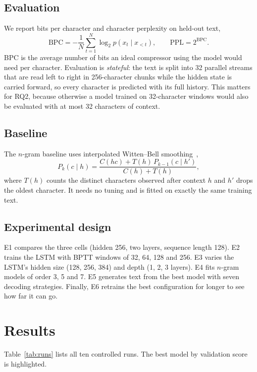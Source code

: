 \documentclass[journal,a4paper]{IEEEtran}
\newcommand{\BPC}{\mathrm{BPC}}
\begin{document}
\subsection{Evaluation}
We report bits per character and character perplexity on held-out text,
\begin{equation}
\BPC = -\frac{1}{N}\sum_{t=1}^{N}\log_2 p(x_t \mid x_{<t}), \qquad \mathrm{PPL} = 2^{\BPC}.
\end{equation}
BPC is the average number of bits an ideal compressor using the model would need per character. Evaluation is \emph{stateful}: the text is split into 32 parallel streams that are read left to right in 256-character chunks while the hidden state is carried forward, so every character is predicted with its full history. This matters for RQ2, because otherwise a model trained on 32-character windows would also be evaluated with at most 32 characters of context.

\subsection{Baseline}
The $n$-gram baseline uses interpolated Witten--Bell smoothing~\cite{witten1991},
\begin{equation}
P_k(c\mid h) = \frac{C(hc) + T(h)\,P_{k-1}(c\mid h')}{C(h) + T(h)},
\end{equation}
where $T(h)$ counts the distinct characters observed after context $h$ and $h'$ drops the oldest character. It needs no tuning and is fitted on exactly the same training text.

\subsection{Experimental design}
E1 compares the three cells (hidden 256, two layers, sequence length 128). E2 trains the LSTM with BPTT windows of 32, 64, 128 and 256. E3 varies the LSTM's hidden size (128, 256, 384) and depth (1, 2, 3 layers). E4 fits $n$-gram models of order 3, 5 and 7. E5 generates text from the best model with seven decoding strategies. Finally, E6 retrains the best configuration for longer to see how far it can go.

\section{Results}
Table~\ref{tab:runs} lists all ten controlled runs. The best model by validation score is highlighted.

\begin{table}[!t]
\centering
\caption{All controlled runs (2{,}500 updates each). $H$: hidden size, $L$: layers, $T$: BPTT length. Wall-clock times are approximate because three runs shared the CPU.}
\label{tab:runs}

\end{table}
\end{document}
